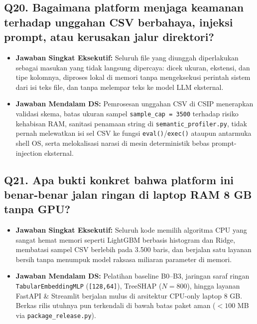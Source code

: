 \documentclass[11pt,a4paper,oneside]{book}
\newcommand{\code}[1]{{\small\nolinkurl{#1}}}
\begin{document}
\subsection*{Q20. Bagaimana platform menjaga keamanan terhadap unggahan CSV berbahaya, injeksi prompt, atau kerusakan jalur direktori?}
\begin{itemize}
  \item \textbf{Jawaban Singkat Eksekutif:} Seluruh file yang diunggah diperlakukan sebagai masukan yang tidak langsung dipercaya: dicek ukuran, ekstensi, dan tipe kolomnya, diproses lokal di memori tanpa mengeksekusi perintah sistem dari isi teks file, dan tanpa melempar teks ke model LLM eksternal.
  \item \textbf{Jawaban Mendalam DS:} Pemrosesan unggahan CSV di CSIP menerapkan validasi skema, batas ukuran sampel \code{sample_cap = 3500} terhadap risiko kehabisan RAM, sanitasi penamaan string di \code{semantic_profiler.py}, tidak pernah melewatkan isi sel CSV ke fungsi \code{eval()}/\code{exec()} ataupun antarmuka shell OS, serta melokalisasi narasi di mesin deterministik bebas prompt-injection eksternal.
\end{itemize}

\subsection*{Q21. Apa bukti konkret bahwa platform ini benar-benar jalan ringan di laptop RAM 8 GB tanpa GPU?}
\begin{itemize}
  \item \textbf{Jawaban Singkat Eksekutif:} Seluruh kode memilih algoritma CPU yang sangat hemat memori seperti LightGBM berbasis histogram dan Ridge, membatasi sampel CSV berlebih pada 3.500 baris, dan berjalan satu layanan bersih tanpa menumpuk model raksasa miliaran parameter di memori.
  \item \textbf{Jawaban Mendalam DS:} Pelatihan baseline B0--B3, jaringan saraf ringan \code{TabularEmbeddingMLP} (\code{[128,64]}), TreeSHAP ($N=800$), hingga layanan FastAPI \& Streamlit berjalan mulus di arsitektur CPU-only laptop 8 GB. Berkas rilis utuhnya pun terkendali di bawah batas paket aman ($< 100$ MB via \code{package_release.py}).
\end{itemize}
\end{document}
